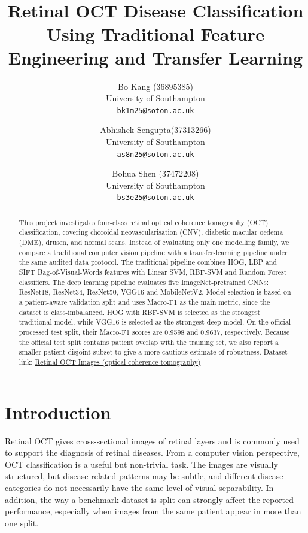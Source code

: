 \documentclass[10pt,twocolumn,letterpaper]{article}
\begin{document}
\title{Retinal OCT Disease Classification Using Traditional Feature Engineering and Transfer Learning}

\author{
Bo Kang (36895385)\\
University of Southampton\\
{\tt\small bk1m25@soton.ac.uk}
\and
Abhishek Sengupta(37313266)\\
University of Southampton\\
{\tt\small as8n25@soton.ac.uk}
\and
Bohua Shen (37472208)\\
University of Southampton\\
{\tt\small bs3e25@soton.ac.uk}
}

\maketitle

\begin{abstract}
This project investigates four-class retinal optical coherence tomography (OCT) classification, covering choroidal neovascularisation (CNV), diabetic macular oedema (DME), drusen, and normal scans. Instead of evaluating only one modelling family, we compare a traditional computer vision pipeline with a transfer-learning pipeline under the same audited data protocol. The traditional pipeline combines HOG, LBP and SIFT Bag-of-Visual-Words features with Linear SVM, RBF-SVM and Random Forest classifiers. The deep learning pipeline evaluates five ImageNet-pretrained CNNs: ResNet18, ResNet34, ResNet50, VGG16 and MobileNetV2. Model selection is based on a patient-aware validation split and uses Macro-F1 as the main metric, since the dataset is class-imbalanced. HOG with RBF-SVM is selected as the strongest traditional model, while VGG16 is selected as the strongest deep model. On the official processed test split, their Macro-F1 scores are 0.9598 and 0.9637, respectively. Because the official test split contains patient overlap with the training set, we also report a smaller patient-disjoint subset to give a more cautious estimate of robustness. Dataset link:
\href{https://www.kaggle.com/datasets/paultimothymooney/kermany2018}{Retinal OCT Images (optical coherence tomography)}
\end{abstract}

\section{Introduction}
Retinal OCT gives cross-sectional images of retinal layers and is commonly used to support the diagnosis of retinal diseases. From a computer vision perspective, OCT classification is a useful but non-trivial task. The images are visually structured, but disease-related patterns may be subtle, and different disease categories do not necessarily have the same level of visual separability. In addition, the way a benchmark dataset is split can strongly affect the reported performance, especially when images from the same patient appear in more than one split.
\end{document}

